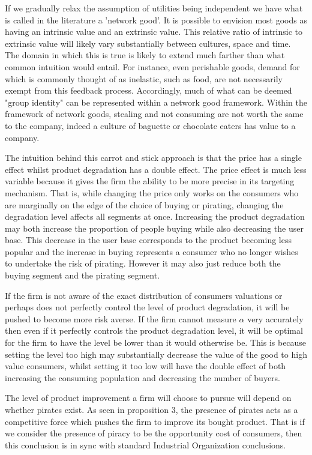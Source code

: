 \documentclass{article}
\begin{document}
If we gradually relax the assumption of utilities being independent we have what is called in the literature a 'network good'. It is possible to envision most goods as having an intrinsic value and an extrinsic value. This relative ratio of intrinsic to extrinsic value will likely vary substantially between cultures, space and time. The domain in which this is true is likely to extend much farther than what common intuition would entail. For instance, even perishable goods, demand for which is commonly thought of as inelastic, such as food, are not necessarily exempt from this feedback process. Accordingly, much of what can be deemed "group identity" can be represented within a network good framework. Within the framework of network goods, stealing and not consuming are not worth the same to the company, indeed a culture of baguette or chocolate eaters has value to a company.  

The intuition behind this carrot and stick approach is that the price has a single effect whilst product degradation has a double effect. The price effect is much less variable because it gives the firm the ability to be more precise in its targeting mechanism. That is, while changing the price only works on the consumers who are marginally on the edge of the choice of buying or pirating, changing the degradation level affects all segments at once. Increasing the product degradation may both increase the proportion of people buying while also decreasing the user base. This decrease in the user base corresponds to the product becoming less popular and the increase in buying represents a consumer who no longer wishes to undertake the risk of pirating. However it may also just reduce both the buying segment and the pirating segment.

If the firm is not aware of the exact distribution of consumers valuations or perhaps does not perfectly control the level of product degradation, it will be pushed to become more risk averse. If the firm cannot measure $\alpha$ very accurately then even if it perfectly controls the product degradation level, it will be optimal for the firm to have the level be lower than it would otherwise be. This is because setting the level too high may substantially decrease the value of the good to high value consumers, whilst setting it too low will have the double effect of both increasing the consuming population and decreasing the number of buyers. 

The level of product improvement a firm will choose to pursue will depend on whether pirates exist. As seen in proposition 3, the presence of pirates acts as a competitive force which pushes the firm to improve its bought product. That is if we consider the presence of piracy to be the opportunity cost of consumers, then this conclusion is in sync with standard Industrial Organization conclusions.
\end{document}
